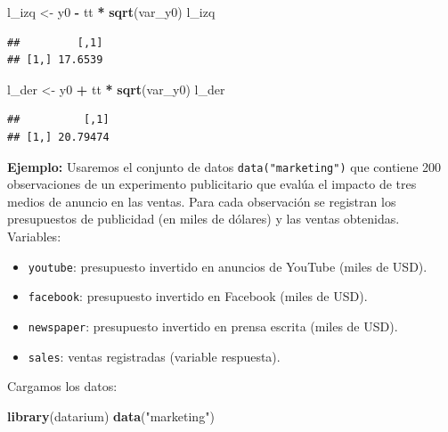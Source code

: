 \documentclass[
]{book}
\newenvironment{Shaded}{\begin{snugshade}}{\end{snugshade}}
\newcommand{\FunctionTok}[1]{\textcolor[rgb]{0.13,0.29,0.53}{\textbf{#1}}}
\newcommand{\NormalTok}[1]{#1}
\newcommand{\OtherTok}[1]{\textcolor[rgb]{0.56,0.35,0.01}{#1}}
\newcommand{\SpecialCharTok}[1]{\textcolor[rgb]{0.81,0.36,0.00}{\textbf{#1}}}
\newcommand{\StringTok}[1]{\textcolor[rgb]{0.31,0.60,0.02}{#1}}
\providecommand{\tightlist}{%
  \setlength{\itemsep}{0pt}\setlength{\parskip}{0pt}}
\begin{document}
\begin{Shaded}
\begin{Highlighting}[]
\NormalTok{l\_izq }\OtherTok{\textless{}{-}}\NormalTok{ y0 }\SpecialCharTok{{-}}\NormalTok{ tt }\SpecialCharTok{*} \FunctionTok{sqrt}\NormalTok{(var\_y0) }
\NormalTok{l\_izq}
\end{Highlighting}
\end{Shaded}

\begin{verbatim}
##         [,1]
## [1,] 17.6539
\end{verbatim}

\begin{Shaded}
\begin{Highlighting}[]
\NormalTok{l\_der }\OtherTok{\textless{}{-}}\NormalTok{ y0 }\SpecialCharTok{+}\NormalTok{ tt }\SpecialCharTok{*} \FunctionTok{sqrt}\NormalTok{(var\_y0) }
\NormalTok{l\_der}
\end{Highlighting}
\end{Shaded}

\begin{verbatim}
##          [,1]
## [1,] 20.79474
\end{verbatim}

\textbf{Ejemplo: } Usaremos el conjunto de datos \texttt{data("marketing")} que contiene 200 observaciones de un experimento publicitario que evalúa el impacto de tres medios de anuncio en las ventas. Para cada observación se registran los presupuestos de publicidad (en miles de dólares) y las ventas obtenidas.
Variables:

\begin{itemize}
\tightlist
\item
  \texttt{youtube}: presupuesto invertido en anuncios de YouTube (miles de USD).
\item
  \texttt{facebook}: presupuesto invertido en Facebook (miles de USD).
\item
  \texttt{newspaper}: presupuesto invertido en prensa escrita (miles de USD).
\item
  \texttt{sales}: ventas registradas (variable respuesta).
\end{itemize}

Cargamos los datos:

\begin{Shaded}
\begin{Highlighting}[]
\FunctionTok{library}\NormalTok{(datarium)}
\FunctionTok{data}\NormalTok{(}\StringTok{"marketing"}\NormalTok{)}
\end{Highlighting}
\end{Shaded}
\end{document}
